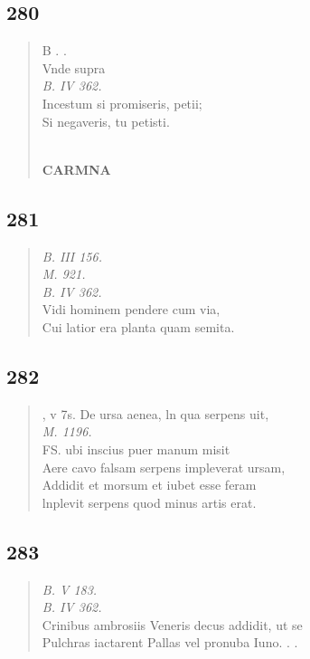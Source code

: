 \documentclass[11pt, a4paper]{report}
\begin{document}
            \subsection*{280}
      \begin{verse}
      B . . \\ Vnde supra \\ \textit{B. IV 362.} \\ Incestum si promiseris, petii; \\ Si negaveris, tu petisti. \\ 
        ﻿\pagebreak 
    \begin{center} \textbf{CARMNA} \end{center} \marginpar{[220]} 
      \end{verse}
  
            \subsection*{281}
      \begin{verse}
      \textit{B. III 156.} \\ \textit{M. 921.} \\ \textit{B. IV 362.} \\ Vidi hominem pendere cum via, \\ Cui latior era planta quam semita. \\ 
      \end{verse}
  
            \subsection*{282}
      \begin{verse}
      , v 7s. De ursa aenea, ln qua serpens uit, \\ \textit{M. 1196.} \\ FS. ubi inscius puer manum misit \\ Aere cavo falsam serpens impleverat ursam, \\ Addidit et morsum et iubet esse feram \\ lnplevit serpens quod minus artis erat. \\ 
      \end{verse}
  
            \subsection*{283}
      \begin{verse}
      \textit{B. V 183.} \\ \textit{B. IV 362.} \\ Crinibus ambrosiis Veneris decus addidit, ut se \\ Pulchras iactarent Pallas vel pronuba Iuno. . . \\ 
      \end{verse}
  
\end{document}
